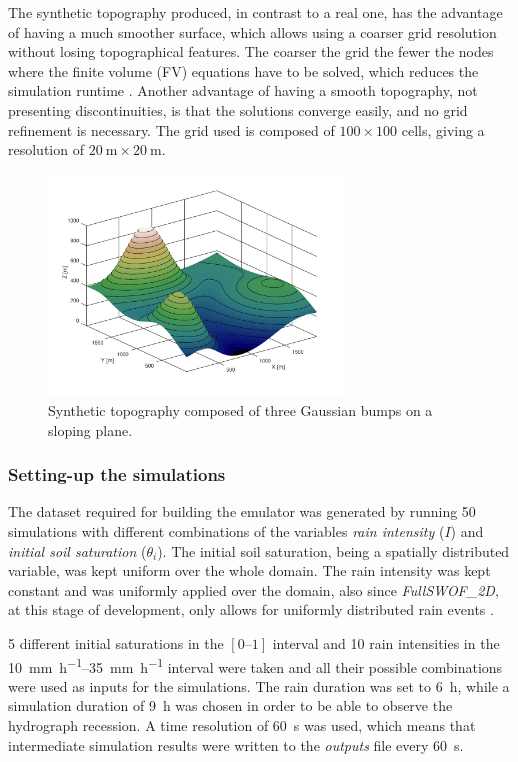 {The synthetic topography produced, in contrast to a real one, has the advantage of having a much smoother surface, which allows using a coarser grid resolution without losing topographical features.
The coarser the grid the fewer the nodes where the finite volume (FV) equations have to be solved, which reduces the simulation runtime . 
Another advantage of having a smooth topography, not presenting discontinuities, is that the solutions converge easily, and no grid refinement is necessary.
The grid used is composed of $\num{100} \times \num{100}$ cells, giving a resolution of $\SI{20}{\meter} \times \SI{20}{\meter}.$

\begin{figure}[h]
  \centering
  \includegraphics[width=0.7\textwidth]{Figures/topography.png}
  \caption{Synthetic topography composed of three Gaussian bumps on a sloping plane.}
  \label{fig:topography}
\end{figure}


\subsubsection{Setting-up the simulations}

The dataset required for building the emulator was generated by running \num{50} simulations with different combinations of the variables \emph{rain intensity} ($I$) and \emph{initial soil saturation} ($\theta_i$).
The initial soil saturation, being a spatially distributed variable, was kept uniform over the whole domain.
The rain intensity was kept constant and was uniformly applied over the domain, also since \textit{FullSWOF\_2D}, at this stage of development, only allows for uniformly distributed rain events \autocite{laguerre_documentation_2016}.

\num{5} different initial saturations in the $[\numrange{0}{1}]$ interval and \num{10} rain intensities in the \SIrange{10}{35}{\milli\metre\per\hour} interval were taken and all their possible combinations were used as inputs for the simulations.
The rain duration was set to \SI{6}{\hour}, while a simulation duration of \SI{9}{\hour} was chosen in order to be able to observe the hydrograph recession. A time resolution of \SI{60}{\second} was used, which means that intermediate simulation results were written to the \emph{outputs} file every \SI{60}{\second}.

}
